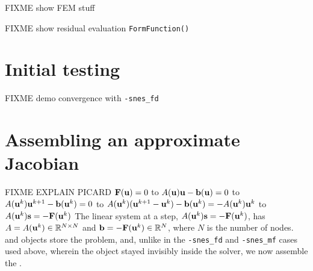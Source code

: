 



FIXME show FEM stuff


FIXME show residual evaluation \texttt{FormFunction()}





\section{Initial testing}

FIXME demo convergence with \texttt{-snes\_fd}


\section{Assembling an approximate Jacobian}

FIXME EXPLAIN PICARD $\mathbf{F}(\mathbf{u})=0$ to $A(\mathbf{u}) \mathbf{u} - \mathbf{b}(\mathbf{u})=0$ to $A(\mathbf{u}^k) \mathbf{u}^{k+1} - \mathbf{b}(\mathbf{u}^k)=0$ to $A(\mathbf{u}^k) (\mathbf{u}^{k+1}-\mathbf{u}^k) - \mathbf{b}(\mathbf{u}^k)= - A(\mathbf{u}^k) \mathbf{u}^k$ to $A(\mathbf{u}^k) \mathbf{s} = -\mathbf{F}(\mathbf{u}^k)$  The linear system at a step, $A(\mathbf{u}^k) \mathbf{s} = -\mathbf{F}(\mathbf{u}^k)$, has $A=A(\mathbf{u}^k)\in\mathbb{R}^{N\times N}$ and $\mathbf{b}=-\mathbf{F}(\mathbf{u}^k)\in\mathbb{R}^N$, where $N$ is the number of nodes.  \pMat and \pVec objects store the problem, and, unlike in the \texttt{-snes\_fd} and \texttt{-snes\_mf} cases used above, wherein the \pMat object stayed invisibly inside the \pSNES solver, we now assemble the \pMat.

